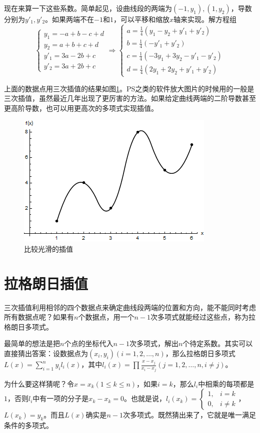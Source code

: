 现在来算一下这些系数。简单起见，设曲线段的两端为$(-1,y_1),(1,y_2)$，导数分别为$y'_1,y'_2$。如果两端不在$-1$和$1$，可以平移和缩放$x$轴来实现。解方程组
\begin{equation*}
\begin{cases}
y_1=-a+b-c+d \\
y_2=a+b+c+d \\
y'_1=3 a-2 b+c \\
y'_2=3 a+2 b+c
\end{cases} \Rightarrow \begin{cases}
a=\frac{1}{4}(y_1-y_2+y'_1+y'_2) \\
b=\frac{1}{4}(-y'_1+y'_2) \\
c=\frac{1}{4}(-3 y_1+3 y_2-y'_1-y'_2) \\
d=\frac{1}{4}(2y_1+2y_2+y'_1+y'_2)
\end{cases}
\end{equation*}

上面的数据点用三次插值的结果如图\ref{fig-disc-data-cubic}。PS之类的软件放大图片的时候用的一般是三次插值，虽然最近几年出现了更厉害的方法。如果给定曲线两端的二阶导数甚至更高阶导数，也可以用更高次的多项式实现插值。
\begin{figure}[htb]
\centering
\includegraphics[width=0.33\linewidth]{fig/disc-data-cubic.png}
\caption{比较光滑的插值}
\label{fig-disc-data-cubic}
\end{figure}
\section{拉格朗日插值}
三次插值利用相邻的四个数据点来确定曲线段两端的位置和方向，能不能同时考虑所有数据点呢？如果有$n$个数据点，用一个$n-1$次多项式就能经过这些点，称为拉格朗日多项式。

最简单的想法是把$n$个点的坐标代入$n-1$次多项式，解出$n$个待定系数。其实可以直接猜出答案：设数据点为$(x_i,y_i)(i=1,2,\dots,n)$，那么拉格朗日多项式$L(x)=\sum_{i=1}^n y_i l_i(x)$，其中$l_i(x)=\prod \frac{x-x_j}{x_i-x_j}(j=1,2,\dots,n, i \ne j)$。

为什么要这样猜呢？令$x=x_k(1 \le k \le n)$，如果$i=k$，那么$l_i$中相乘的每项都是$1$，否则$l_i$中有一项的分子是$x_k-x_k=0$。也就是说，$l_i(x_k)=\begin{cases} 1, &i=k \\ 0, &i \ne k \end{cases}$，$L(x_k)=y_k$。而且$L(x)$确实是$n-1$次多项式。既然猜出来了，它就是唯一满足条件的多项式。

